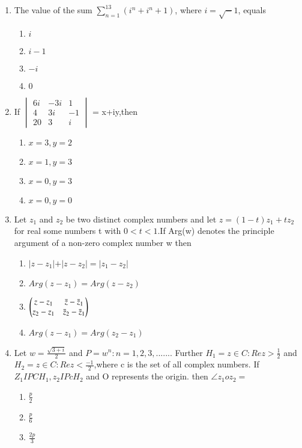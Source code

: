 \begin{enumerate}[label=\arabic*.,ref=\thesubsection.\theenumi]
\begin{enumerate}
    \end{enumerate}
    \item The value of the sum $\sum_{n=1}^{13}(i^n+i^n+1)$, where $i = \sqrt -1$, equals
    \begin{enumerate}
    \item   $i$ 
    \item   $i-1$
    \item   $-i$    
    \item   $0$
    \end{enumerate}
    \item If $\begin{vmatrix}
    6i &-3i& 1\\ 4&3i&-1 \\20&3&i    \end{vmatrix}$ = x+iy,then 
    \begin{enumerate}
    \item   $x=3,y=2$ 
    \item   $x=1,y=3$
    \item   $x=0,y=3$    
    \item  $x=0,y=0$
    \end{enumerate}
    \item Let $z_1$ and $z_2$ be two distinct complex numbers and let $z=(1-t)z_1+tz_2$ for real some numbers t with $0 < t < 1$.If Arg(w) denotes the principle argument of a non-zero complex number w then 
    \begin{enumerate}
    \item   $\vert z-z_1 \vert+\vert z-z_2 \vert=\vert z_1-z_2 \vert$ 
    \item   $Arg(z-z_1)=Arg(z-z_2)$
    \item   $ \begin{pmatrix}z-z_1 & \bar z-\bar z_1 \\ z_2-z_1 & \bar z_2-\bar z_1\end{pmatrix}$         
    \item  $Arg(z-z_1)=Arg(z_2-z_1)$
    \end{enumerate}
    \item Let 
    $w = \frac{\sqrt{3+i}}{2}$ and 
    $P = {w^n:n=1, 2, 3,......}$. Further $H_1 = { z\in C: Rez>\frac{1}{2}}$ and 
    $H_2={ z\in C: Rez<\frac{-1}{2}}$,where c is the set of all complex numbers. 
    If $Z_1 I P C H_1,z_2 I P c H_2$ and O represents the origin. then $\angle z_1 o z_2 =$
    \begin{enumerate}
    \item  $\frac{p}{2}$ 
    \item  $\frac{p}{6}$
    \item  $\frac{2p}{3}$

\end{enumerate}
\end{enumerate}
